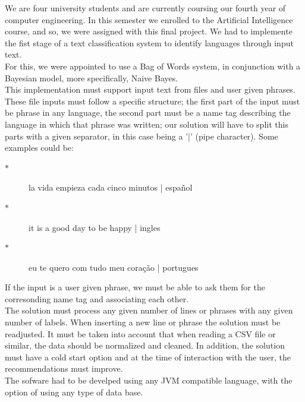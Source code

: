 \documentclass[sigconf,12pt,review=false,natbib=false]{acmart}
\begin{document}
We are four university students and are currently coursing our fourth year of computer engineering. In this semester
we enrolled to the Artificial Intelligence course, and so, we were assigned with this final project. We had to 
implemente the fist stage of a text classification system to identify languages through input text. \\

For this, we were appointed to use a Bag of Words system, in conjunction with a Bayesian model, more specifically,
Naive Bayes. \\

This implementation must support input text from files and user given phrases. These file inputs must follow a specific
structure; the first part of the input must be phrase in any language, the second part must be a name tag describing
the language in which that phrase was written; our solution will have to split this parts with a given separator,
in this case being a '|' (pipe character). Some examples could be: \\ 

\begin{description}

  \item[$\ast$] la vida empieza cada cinco minutos | español 

  \item[$\ast$] it is a good day to be happy | ingles

  \item[$\ast$] eu te quero com tudo meu coração | portugues \\ 

\end{description}

If the input is a user given phrase, we must be able to ask them for the corresonding name tag and associating each 
other. \\

The solution must process any given number of lines or phrases with any given number of labels. When inserting a new
line or phrase the solution must be readjusted. It must be taken into account that when reading a CSV file or similar,
the data should be normalized and cleaned. In addition, the solution must have a cold start option and at the time
of interaction with the user, the recommendations must improve. \\

The sofware had to be develped using any JVM compatible language, with the option of using any type of data base. \\
\end{document}
